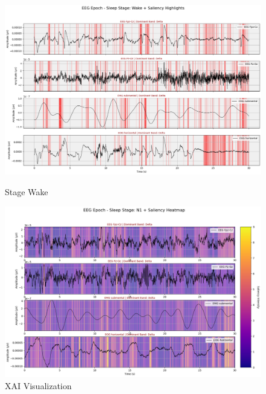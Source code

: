 \begin{figure}[htbp]
	\centering
	\begin{minipage}[b]{0.45\linewidth}
		\includegraphics[width=\linewidth]{"img/paper_3/stage wake"}
		\caption{Stage Wake}
		\label{fig:stage-wake}
	\end{minipage}
	\hfill
	\begin{minipage}[b]{0.45\linewidth}
		\includegraphics[width=\linewidth]{img/paper_3/XAI4}
		\caption{XAI Visualization}
		\label{fig:xai4}
	\end{minipage}
\end{figure}


